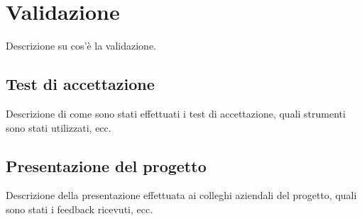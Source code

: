 \section{Validazione}
\label{sez:validazione}

Descrizione su cos'è la validazione.

\subsection{Test di accettazione}
\label{subsec:test-accettazione}

Descrizione di come sono stati effettuati i test di accettazione, quali strumenti sono stati utilizzati, ecc.\\

\subsection{Presentazione del progetto}
\label{subsec:presentazione-progetto}

Descrizione della presentazione effettuata ai colleghi aziendali del progetto, quali sono stati i feedback ricevuti, ecc.\\
